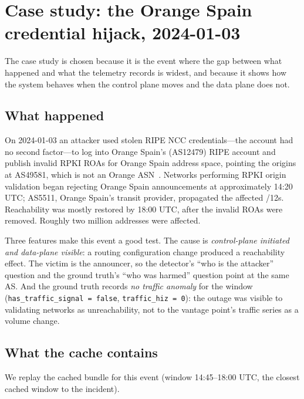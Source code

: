 \section{Case study: the Orange Spain credential hijack, 2024-01-03}
\label{sec:case}

The case study is chosen because it is the event where the gap between
what happened and what the telemetry records is widest, and because it
shows how the system behaves when the control plane moves and the data
plane does not.

\subsection{What happened}

On 2024-01-03 an attacker used stolen RIPE NCC credentials---the
account had no second factor---to log into Orange Spain's (AS12479)
RIPE account and publish invalid RPKI ROAs for Orange Spain address
space, pointing the origins at AS49581, which is not an Orange
ASN~\cite{apnic-orange-2024}. Networks performing RPKI origin
validation began rejecting Orange Spain announcements at approximately
14:20 UTC; AS5511, Orange Spain's transit provider, propagated the
affected /12s. Reachability was mostly restored by 18:00 UTC, after the
invalid ROAs were removed. Roughly two million addresses were affected.

Three features make this event a good test. The cause is
\emph{control-plane initiated and data-plane visible}: a routing
configuration change produced a reachability effect. The victim is the
announcer, so the detector's ``who is the attacker'' question and the
ground truth's ``who was harmed'' question point at the same AS. And the
ground truth records \emph{no traffic anomaly} for the window
(\texttt{has\_traffic\_signal = false}, \texttt{traffic\_hiz = 0}):
the outage was visible to validating networks as unreachability, not to
the vantage point's traffic series as a volume change.

\subsection{What the cache contains}

We replay the cached bundle for this event (window 14:45--18:00 UTC,
the closest cached window to the incident).

